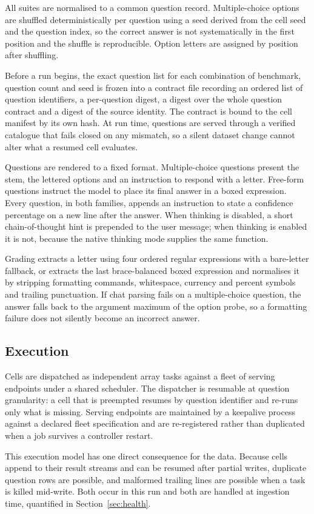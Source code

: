 All suites are normalised to a common question record. Multiple-choice options are
shuffled deterministically per question using a seed derived from the cell seed and the
question index, so the correct answer is not systematically in the first position and the
shuffle is reproducible. Option letters are assigned by position after shuffling.

Before a run begins, the exact question list for each combination of benchmark, question
count and seed is frozen into a contract file recording an ordered list of question
identifiers, a per-question digest, a digest over the whole question contract and a digest
of the source identity. The contract is bound to the cell manifest by its own hash. At run
time, questions are served through a verified catalogue that fails closed on any mismatch,
so a silent dataset change cannot alter what a resumed cell evaluates.

Questions are rendered to a fixed format. Multiple-choice questions present the stem, the
lettered options and an instruction to respond with a letter. Free-form questions instruct
the model to place its final answer in a boxed expression. Every question, in both
families, appends an instruction to state a confidence percentage on a new line after the
answer. When thinking is disabled, a short chain-of-thought hint is prepended to the user
message; when thinking is enabled it is not, because the native thinking mode supplies the
same function.

Grading extracts a letter using four ordered regular expressions with a bare-letter
fallback, or extracts the last brace-balanced boxed expression and normalises it by
stripping formatting commands, whitespace, currency and percent symbols and trailing
punctuation. If chat parsing fails on a multiple-choice question, the answer falls back to
the argument maximum of the option probe, so a formatting failure does not silently become
an incorrect answer.

\subsection{Execution}

Cells are dispatched as independent array tasks against a fleet of serving endpoints under
a shared scheduler. The dispatcher is resumable at question granularity: a cell that is
preempted resumes by question identifier and re-runs only what is missing. Serving
endpoints are maintained by a keepalive process against a declared fleet specification and
are re-registered rather than duplicated when a job survives a controller restart.

This execution model has one direct consequence for the data. Because cells append to their
result streams and can be resumed after partial writes, duplicate question rows are
possible, and malformed trailing lines are possible when a task is killed mid-write. Both
occur in this run and both are handled at ingestion time, quantified in
Section~\ref{sec:health}.
